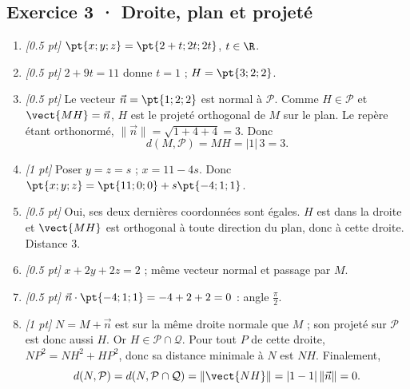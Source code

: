 \subsection*{Exercice 3 · Droite, plan et projeté}\begin{enumerate}

\item \textit{[\num{0,5} pt]} $\pt{x;y;z}=\pt{2+t;2t;2t}$, $t\in\R$.

\item \textit{[\num{0,5} pt]} $2+9t=11$ donne $t=1$ ; $H=\pt{3;2;2}$.

\item \textit{[\num{0,5} pt]} Le vecteur $\vec n=\pt{1;2;2}$ est normal à $\mathcal P$. Comme $H\in\mathcal P$ et $\vect{MH}=\vec n$, $H$ est le projeté orthogonal de $M$ sur le plan. Le repère étant orthonormé, $\|\vec n\|=\sqrt{1+4+4}=3$. Donc
\[d(M,\mathcal P)=MH=|1|\,3=3.\]

\item \textit{[1 pt]} Poser $y=z=s$ ; $x=11-4s$. Donc $\pt{x;y;z}=\pt{11;0;0}+s\pt{-4;1;1}$.

\item \textit{[\num{0,5} pt]} Oui, ses deux dernières coordonnées sont égales. $H$ est dans la droite et $\vect{MH}$ est orthogonal à toute direction du plan, donc à cette droite. Distance $3$.

\item \textit{[\num{0,5} pt]} $x+2y+2z=2$ ; même vecteur normal et passage par $M$.

\item \textit{[\num{0,5} pt]} $\vec n\cdot\pt{-4;1;1}=-4+2+2=0$ : angle $\frac{\pi}{2}$.

\item \textit{[1 pt]} $N=M+\vec n$ est sur la même droite normale que $M$ ; son projeté sur $\mathcal P$ est donc aussi $H$. Or $H\in\mathcal P\cap\mathcal Q$. Pour tout $P$ de cette droite, $NP^2=NH^2+HP^2$, donc sa distance minimale à $N$ est $NH$. Finalement,
\[d(N,\mathcal P)=d(N,\mathcal P\cap\mathcal Q)=\|\vect{NH}\|=|1-1|\,\|\vec n\|=0.\]

\end{enumerate}

